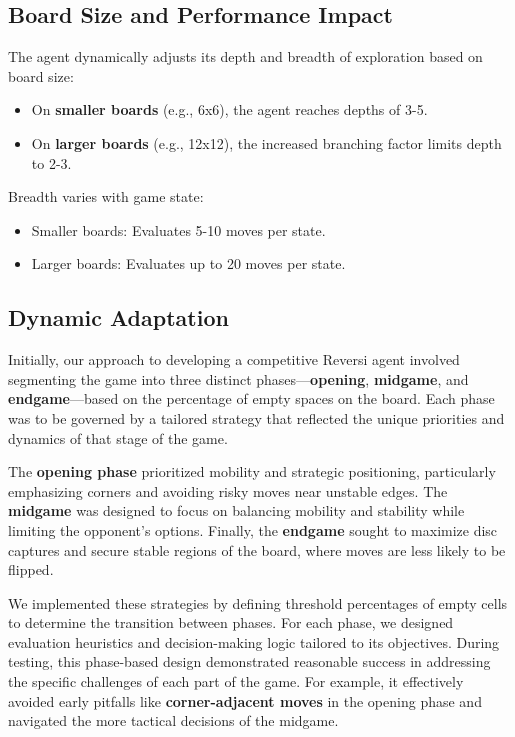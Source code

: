 \documentclass[11pt]{article}
\begin{document}
\subsection*{Board Size and Performance Impact}
\noindent The agent dynamically adjusts its depth and breadth of exploration based on board size:
\begin{itemize}
    \item On \textbf{smaller boards} (e.g., 6x6), the agent reaches depths of 3-5.
    \item On \textbf{larger boards} (e.g., 12x12), the increased branching factor limits depth to 2-3.
\end{itemize}

\noindent Breadth varies with game state:
\begin{itemize}
    \item Smaller boards: Evaluates 5-10 moves per state.
    \item Larger boards: Evaluates up to 20 moves per state.
\end{itemize}


\subsection*{Dynamic Adaptation}
Initially, our approach to developing a competitive Reversi agent involved segmenting the game into three distinct phases—\textbf{opening}, \textbf{midgame}, and \textbf{endgame}—based on the percentage of empty spaces on the board. Each phase was to be governed by a tailored strategy that reflected the unique priorities and dynamics of that stage of the game. 

\noindent The \textbf{opening phase} prioritized mobility and strategic positioning, particularly emphasizing corners and avoiding risky moves near unstable edges. The \textbf{midgame} was designed to focus on balancing mobility and stability while limiting the opponent's options. Finally, the \textbf{endgame} sought to maximize disc captures and secure stable regions of the board, where moves are less likely to be flipped.

\noindent We implemented these strategies by defining threshold percentages of empty cells to determine the transition between phases. For each phase, we designed evaluation heuristics and decision-making logic tailored to its objectives. During testing, this phase-based design demonstrated reasonable success in addressing the specific challenges of each part of the game. For example, it effectively avoided early pitfalls like \textbf{corner-adjacent moves} in the opening phase and navigated the more tactical decisions of the midgame.
\end{document}
